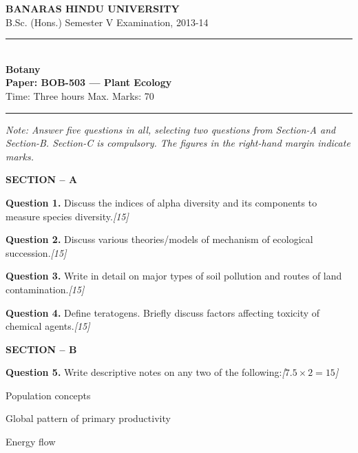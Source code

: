 \documentclass[11pt,a4paper]{article}
\newcommand{\pts}[1]{\hfill   \textit{[#1]}}
\begin{document}
\begin{center}
  {\large\bfseries BANARAS HINDU UNIVERSITY}\\[2pt]
  {\normalsize B.Sc. (Hons.) Semester V Examination, 2013-14}\\[6pt]
  \rule{0.8\linewidth}{0.5pt}\\[6pt]
  {\large\bfseries Botany}\\[4pt]
  {\large\bfseries Paper: BOB-503 --- Plant Ecology}\\[4pt]
  {\normalsize Time: Three hours \hfill Max. Marks: 70}
\end{center}

\rule{\linewidth}{0.4pt}

\smallskip



\noindent   \textit{Note: Answer five questions in all, selecting two questions from Section-A and Section-B. Section-C is compulsory. The figures in the right-hand margin indicate marks.}

\bigskip

\begin{center}
   \textbf{SECTION -- A}
\end{center}

\medskip


\noindent   \textbf{Question 1.} Discuss the indices of alpha diversity and its components to measure species diversity.\pts{15}

\medskip


\noindent   \textbf{Question 2.} Discuss various theories/models of mechanism of ecological succession.\pts{15}

\medskip


\noindent   \textbf{Question 3.} Write in detail on major types of soil pollution and routes of land contamination.\pts{15}

\medskip


\noindent   \textbf{Question 4.} Define teratogens. Briefly discuss factors affecting toxicity of chemical agents.\pts{15}

\bigskip

\begin{center}
   \textbf{SECTION -- B}
\end{center}

\medskip


\noindent   \textbf{Question 5.} Write descriptive notes on any two of the following:\pts{$7.5  \times 2 = 15$}

\begin{parts}
  \item Population concepts
  \item Global pattern of primary productivity
  \item Energy flow
\end{parts}
\end{document}
